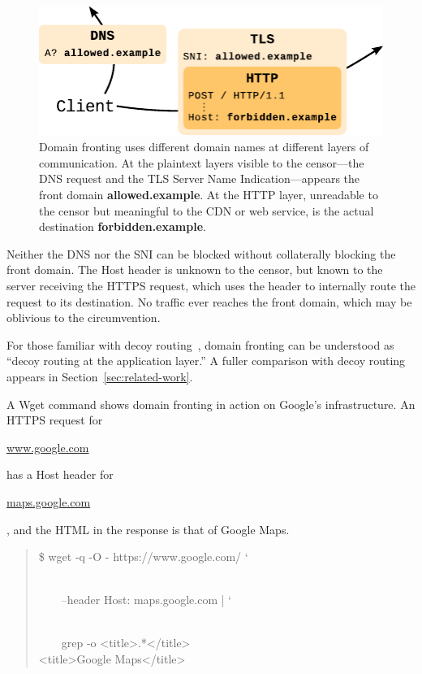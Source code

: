 \documentclass[conference]{IEEEtran}
\def\urll#1{\begin{NoHyper}\url{#1}\end{NoHyper}}
\begin{document}
\begin{figure}[h]
\centering
\includegraphics[width=\linewidth]{fronting}
\caption{
Domain fronting uses different domain names at different layers of communication.
At the plaintext layers visible to the censor---the DNS request and the
TLS Server Name Indication---appears
the front domain \mbox{\textbf{allowed.example}}.
At the HTTP layer, unreadable to the censor but meaningful to the CDN or web service,
is the actual destination \mbox{\textbf{forbidden.example}}.
}
\label{fig:fronting}
\end{figure}

Neither the DNS nor the SNI can be blocked without
collaterally blocking the front domain.
The Host header is unknown to the censor,
but known to the server receiving the HTTPS request,
which uses the header to internally route the request to its destination.
No traffic ever reaches the front domain,
which may be oblivious to the circumvention.

For those familiar with decoy routing~\cite{decoyrouting,telex,cirripede,tapdance},
domain fronting can be understood as
``decoy routing at the application layer.''
A fuller comparison with decoy routing appears in Section~\ref{sec:related-work}.

A Wget command shows domain fronting in action
on Google's infrastructure.
An HTTPS request for \urll{www.google.com} has a Host header for
\urll{maps.google.com}, and the HTML in the response is that of Google Maps.

\noindent
\begin{quote}
%
\$ wget -q -O - https://www.google.com/ \char`\\\\
\strut~~~~--header \textquotesingle{}Host: maps.google.com\textquotesingle{} | \char`\\\\
\strut~~~~grep -o \textquotesingle{}<title>.*</title>\textquotesingle{}\\
<title>Google Maps</title>
\end{quote}
\end{document}
